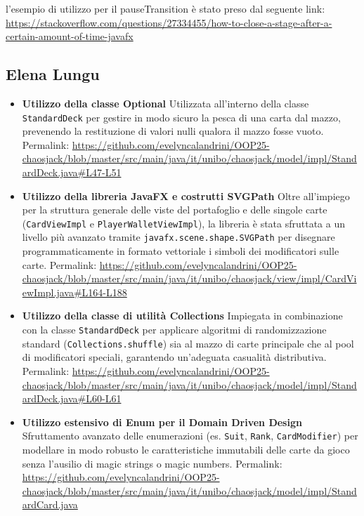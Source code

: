 \documentclass[a4paper,12pt]{report}
\begin{document}
	l'esempio di utilizzo per il pauseTransition è stato preso dal seguente link: \url{https://stackoverflow.com/questions/27334455/how-to-close-a-stage-after-a-certain-amount-of-time-javafx}

    \subsection*{Elena Lungu}                                                                           
    \begin{itemize}                                                                                     
        \item \textbf{Utilizzo della classe Optional}                                                   
        Utilizzata all'interno della classe \texttt{StandardDeck} per gestire in modo sicuro la pesca di
  una carta dal mazzo, prevenendo la restituzione di valori nulli qualora il mazzo fosse vuoto.         
        Permalink: \url{https://github.com/evelyncalandrini/OOP25-                                      
  chaosjack/blob/master/src/main/java/it/unibo/chaosjack/model/impl/StandardDeck.java#L47-L51}          
                                                              
        \item \textbf{Utilizzo della libreria JavaFX e costrutti SVGPath}                               
        Oltre all'impiego per la struttura generale delle viste del portafoglio e delle singole carte   
  (\texttt{CardViewImpl} e \texttt{PlayerWalletViewImpl}), la libreria è stata sfruttata a un livello   
  più avanzato tramite \texttt{javafx.scene.shape.SVGPath} per disegnare programmaticamente in formato  
  vettoriale i simboli dei modificatori sulle carte.                                                    
        Permalink: \url{https://github.com/evelyncalandrini/OOP25-                                      
  chaosjack/blob/master/src/main/java/it/unibo/chaosjack/view/impl/CardViewImpl.java#L164-L188}         
        
        \item \textbf{Utilizzo della classe di utilità Collections}
        Impiegata in combinazione con la classe \texttt{StandardDeck} per applicare algoritmi di        
  randomizzazione standard (\texttt{Collections.shuffle}) sia al mazzo di carte principale che al pool  
  di modificatori speciali, garantendo un'adeguata casualità distributiva.
        Permalink: \url{https://github.com/evelyncalandrini/OOP25-
  chaosjack/blob/master/src/main/java/it/unibo/chaosjack/model/impl/StandardDeck.java#L60-L61}          
        
        \item \textbf{Utilizzo estensivo di Enum per il Domain Driven Design}
        Sfruttamento avanzato delle enumerazioni (es. \texttt{Suit}, \texttt{Rank},
  \texttt{CardModifier}) per modellare in modo robusto le caratteristiche immutabili delle carte da     
  gioco senza l'ausilio di magic strings o magic numbers.
        Permalink: \url{https://github.com/evelyncalandrini/OOP25-
  chaosjack/blob/master/src/main/java/it/unibo/chaosjack/model/impl/StandardCard.java}
    \end{itemize}
    
\end{document}
